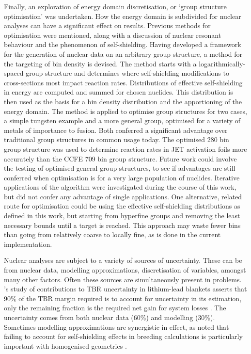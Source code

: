Finally, an exploration of energy domain discretisation, or `group structure optimisation' was undertaken. How the energy domain is subdivided for nuclear analyses can have a significant effect on results. Previous methods for optimisation were mentioned, along with a discussion of nuclear resonant behaviour and the phenomenon of self-shielding. Having developed a framework for the generation of nuclear data on an arbitrary group structure, a method for the targeting of bin density is devised. The method starts with a logarithmically-spaced group structure and determines where self-shielding modifications to cross-sections most impact reaction rates. Distributions of effective self-shielding in energy are computed and summed for chosen nuclides. This distribution is then used as the basis for a bin density distribution and the apportioning of the energy domain. The method is applied to optimise group structures for two cases, a simple tungsten example and a more general group, optimised for a variety of metals of importance to fusion. Both conferred a significant advantage over traditional group structures in common usage today. The optimised 280 bin group structure was used to determine reaction rates in JET activation foils more accurately than the CCFE 709 bin group structure. Future work could involve the testing of optimised general group structures, to see if advantages are still conferred when optimisation is for a very large population of nuclides. Iterative applications of the algorithm were investigated during the course of this work, but did not confer any advantage of single applications. One alternative, related route for optimisation could be using the effective self-shielding distributions as defined in this work, but starting from hyperfine groups and removing the least necessary bounds until a target is reached. This approach may waste fewer bins than going from relatively coarse to locally fine, as is done in the current implementation.

Nuclear analyses are subject to a variety of sources of uncertainty. These can be from nuclear data, modelling approximations, discretisation of variables, amongst many other factors. Often these sources are simultaneously present in problems. \citeauthor{El-Guebaly2009}'s study of contributions to TBR uncertainty in lithium-lead blankets asserts that 90\% of the TBR margin required is to account for uncertainty in its estimation, only the remaining fraction is the required net gain for system losses \cite{El-Guebaly2009}. The uncertainty comes from both nuclear data (60\%) and modelling (30\%). Sometimes modelling approximations are synergistic in effect, as \citeauthor{Pelloni1989} noted that failing to account for self-shielding effects in breeding calculations is particularly important with homogenised geometries \cite{Pelloni1989}. 

